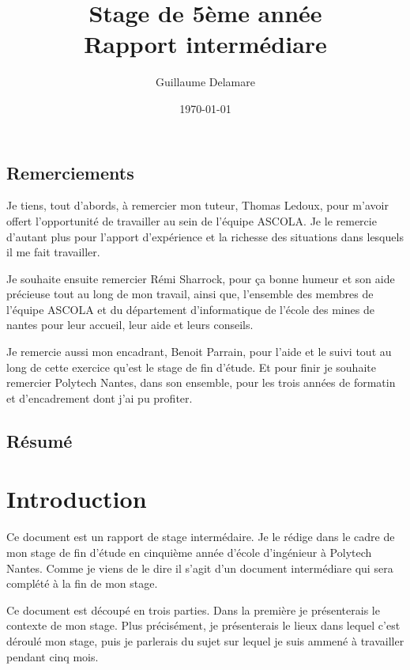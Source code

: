 \documentclass[a4paper, 11pt]{report}
\title{Stage de 5ème année\\ \large Rapport intermédiare}
\author{Guillaume Delamare}
\date{\today}
\begin{document}
\renewcommand{\labelitemi}{$\bullet$}
\renewcommand{\labelitemii}{$\diamond$}
\renewcommand{\labelitemiii}{$\ast$}
\renewcommand{\labelitemiv}{$\cdot$}

\maketitle

\section*{Remerciements}
Je tiens, tout d'abords, à remercier mon tuteur, Thomas Ledoux, pour m'avoir offert l'opportunité de travailler au sein de l'équipe ASCOLA. Je le remercie d'autant plus pour l'apport d'expérience et la richesse des situations dans lesquels il me fait travailler.

Je souhaite ensuite remercier Rémi Sharrock, pour ça bonne humeur et son aide précieuse tout au long de mon travail, ainsi que, l'ensemble des membres de l'équipe ASCOLA et du département d'informatique de l'école des mines de nantes pour leur accueil, leur aide et leurs conseils.

Je remercie aussi mon encadrant, Benoit Parrain, pour l'aide et le suivi tout au long de cette exercice qu'est le stage de fin d'étude. Et pour finir je souhaite remercier Polytech Nantes, dans son ensemble, pour les trois années de formatin et d'encadrement dont j'ai pu profiter.

\newpage

\section*{Résumé}

\newpage

\tableofcontents



\chapter{Introduction}
Ce document est un rapport de stage intermédaire. Je le rédige dans le cadre de mon stage de fin d'étude en cinquième année d'école d'ingénieur à Polytech Nantes. Comme je viens de le dire il s'agit d'un document intermédiare qui sera complété à la fin de mon stage. 

Ce document est découpé en trois parties. Dans la première je présenterais le contexte de mon stage. Plus précisément, je présenterais le lieux dans lequel c'est déroulé mon stage, puis je parlerais du sujet sur lequel je suis ammené à travailler pendant cinq mois.
\end{document}
